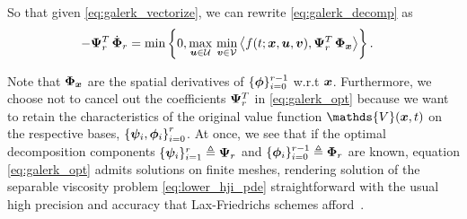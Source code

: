 %
So that given \eqref{eq:galerk_vectorize}, we can rewrite \eqref{eq:galerk_decomp} as 
%
\begin{align}
	-\hilbertcoeffspace_r^T \, \dot{\hilbertparamspace}_r  &= \min \left\{0, \max_{\control \in \mathcal{U}} \, \min_{\disturb \in \mathcal{V}} \left\langle f(t; \state, \control, \disturb),  \hilbertcoeffspace_r^T \, \hilbertparamspace_{\state}\right\rangle \right\}. %
	\label{eq:galerk_opt}
\end{align}

%
%

\begin{remark}
	Note that $\bm{\Phi}_{\bm{x}}$ are the spatial derivatives of $\{\bm{\phi}\}_{i=0}^{r-1}$ w.r.t $\bm{x}$. Furthermore, we choose not to cancel out the coefficients $\bm{\Psi}_r^T$ in \eqref{eq:galerk_opt} because we want to retain the characteristics of the original value function $\mathds{V}(\state, t)$ on the respective bases, $\left\{\bm{\psi}_i, \bm{\phi}_i\right\}_{i=0}^{r}$. At once, we see that if the optimal decomposition components $\{\bm{\psi}_i\}_{i=1}^r \triangleq \bm{\Psi}_r$ and $\{\bm{\phi}_i\}_{i=0}^{r-1} \triangleq \bm{\Phi}_r$ are known, equation \eqref{eq:galerk_opt} admits solutions  on finite meshes, rendering solution of the separable viscosity problem \eqref{eq:lower_hji_pde} straightforward  with the usual high precision and accuracy that Lax-Friedrichs schemes afford~\cite{CrandallLaxFriedrichs, CrandallFractional, Crandall1984, OsherShuENO}. 
\end{remark}


